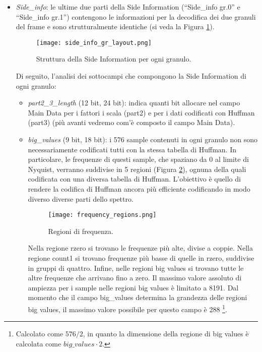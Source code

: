 \begin{itemize}
				\item \textit{Side\_info}: le ultime due parti della Side Information (``Side\_info gr.0'' e ``Side\_info gr.1'') contengono le informazioni per la decodifica dei due granuli del frame e sono strutturalmente identiche (si veda la Figura \ref{fig:side_info_gr_layout}).
				
					\begin{figure}[h!]
						\centering
							\texttt{[image: side\_info\_gr\_layout.png]}
						\caption{Struttura della Side Information per ogni granulo.}
						\label{fig:side_info_gr_layout}
					\end{figure}
					
					Di seguito, l'analisi dei sottocampi che compongono la Side Information di ogni granulo:
					
					\begin{itemize}
						
						\item \textit{part2\_3\_length} (12 bit, 24 bit): indica quanti bit allocare nel campo Main Data per i fattori i scala (part2) e per i dati codificati con Huffman (part3) (più avanti vedremo com'è composto il campo Main Data).
						
						\item \textit{big\_values} (9 bit, 18 bit): i 576 sample contenuti in ogni granulo non sono necessariamente codificati tutti con la stessa tabella di Huffman. In particolare, le frequenze di questi sample, che spaziano da 0 al limite di Nyquist, verranno suddivise in 5 regioni (Figura \ref{fig:frequency_regions}), ognuna della quali codificata con una diversa tabella di Huffman. L'obiettivo è quello di rendere la codifica di Huffman ancora più efficiente codificando in modo diverso diverse parti dello spettro.
						
							\begin{figure}[h!]
								\centering
									\texttt{[image: frequency\_regions.png]}
								\caption{Regioni di frequenza.}
								\label{fig:frequency_regions}
							\end{figure}
							
							Nella regione rzero si trovano le frequenze più alte, divise a coppie. Nella regione count1 si trovano frequenze più basse di quelle in rzero, suddivise in gruppi di quattro. Infine, nelle regioni big values si trovano tutte le altre frequenze che arrivano fino a zero. Il massimo valore assoluto di ampiezza per i sample nelle regioni big values è limitato a 8191. Dal momento che il campo big\_values determina la grandezza delle regioni big values, il massimo valore possibile per questo campo è 288 \footnote{Calcolato come $576/2$, in quanto la dimensione della regione di big values è calcolata come $big\_values\cdot 2$.}.
						

\end{itemize}
\end{itemize}
